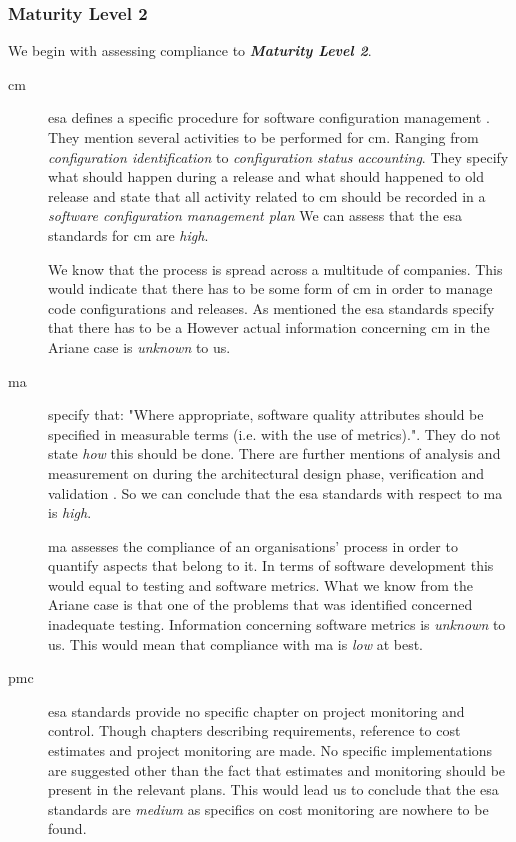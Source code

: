 \subsubsection{Maturity Level 2}
We begin with assessing compliance to \textbf{\textit{Maturity Level 2}}.

\begin{description}
\item[\ac{cm}]
\ac{esa} defines a specific procedure for software configuration management \citep[82]{esaSEstandards1991}. They mention several activities to be performed for \ac{cm}. Ranging from \textit{configuration identification} to \textit{configuration status accounting}. They specify what should happen during a release and what should happened to old release and state that all activity related to \ac{cm} should be recorded in a \textit{software configuration management plan} We can assess that the \ac{esa} standards for \ac{cm} are \textit{high}.

 We know that the process is spread across a multitude of companies. This would indicate that there has to be some form of \ac{cm} in order to manage code configurations and releases. As mentioned the \ac{esa} standards specify that there has to be a   However actual information concerning \ac{cm} in the Ariane case is \textit{unknown} to us. 

\item[\ac{ma}]
\citep[38]{esaSEstandards1991} specify that: "Where appropriate, software quality attributes should be specified in measurable terms (i.e. with the use of metrics).". They do not state \textit{how} this should be done. There are further mentions of analysis and measurement on \citep[46]{esaSEstandards1991} during the architectural design phase, verification and validation \citep[95]{esaSEstandards1991}. So we can conclude that the \ac{esa} standards with respect to \ac{ma} is \textit{high}.

\ac{ma} assesses the compliance of an organisations' process in order to quantify aspects that belong to it. In terms of software development this would equal to testing and software metrics. What we know from the Ariane case is that one of the problems that was identified concerned inadequate testing. Information concerning software metrics is \textit{unknown} to us. This would mean that compliance with \ac{ma} is \textit{low} at best. 

\item[\ac{pmc}]
\ac{esa} standards provide no specific chapter on project monitoring and control. Though chapters describing requirements, reference to cost estimates and project monitoring are made. 
No specific implementations are suggested other than the fact that estimates and monitoring should be present in the relevant plans.
This would lead us to conclude that the \ac{esa} standards are \textit{medium} as specifics on cost monitoring are nowhere to be found.


\end{description}

